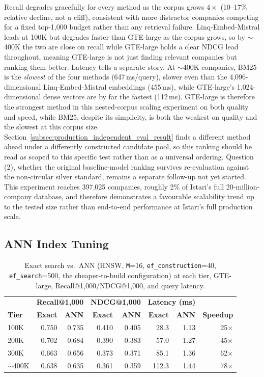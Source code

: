 \documentclass[a4paper,oneside,bibliography=totoc]{scrbook}
\begin{document}
Recall degrades gracefully for every method as the corpus grows $4\times$ (10--17\% relative decline, not a cliff), consistent with more distractor companies competing for a fixed top-1{,}000 budget rather than any retrieval failure. Linq-Embed-Mistral leads at 100K but degrades faster than GTE-large as the corpus grows, so by $\sim$400K the two are close on recall while GTE-large holds a clear NDCG lead throughout, meaning GTE-large is not just finding relevant companies but ranking them better. Latency tells a separate story. At $\sim$400K companies, BM25 is the \emph{slowest} of the four methods (647\,ms/query), slower even than the 4{,}096-dimensional Linq-Embed-Mistral embeddings (455\,ms), while GTE-large's 1{,}024-dimensional dense vectors are by far the fastest (112\,ms). GTE-large is therefore the strongest method in this nested-corpus scaling experiment on both quality and speed, while BM25, despite its simplicity, is both the weakest on quality and the slowest at this corpus size. Section~\ref{subsec:production_independent_eval_result} finds a different method ahead under a differently constructed candidate pool, so this ranking should be read as scoped to this specific test rather than as a universal ordering. Question (2), whether the original baseline-model ranking survives re-evaluation against the non-circular silver standard, remains a separate follow-up not yet started. This experiment reaches 397,025 companies, roughly 2\% of Istari's full 20-million-company database, and therefore demonstrates a favourable scalability trend up to the tested size rather than end-to-end performance at Istari's full production scale.

\subsection{ANN Index Tuning}
\label{subsec:ann_tuning_result}

\begin{table}[ht]
\centering
\caption{Exact search vs.\ ANN (HNSW, \texttt{M}=16, \texttt{ef\_construction}=40, \texttt{ef\_search}=500, the cheaper-to-build configuration) at each tier, GTE-large, Recall@1{,}000/NDCG@1{,}000, and query latency.}
\label{tab:ann_tuning}
\begin{tabular}{lrrrrrrr}
\toprule
& \multicolumn{2}{c}{\textbf{Recall@1{,}000}} & \multicolumn{2}{c}{\textbf{NDCG@1{,}000}} & \multicolumn{2}{c}{\textbf{Latency (ms)}} & \\
\textbf{Tier} & \textbf{Exact} & \textbf{ANN} & \textbf{Exact} & \textbf{ANN} & \textbf{Exact} & \textbf{ANN} & \textbf{Speedup} \\
\midrule
100K & 0.750 & 0.735 & 0.410 & 0.405 & 28.3 & 1.13 & 25$\times$ \\
200K & 0.702 & 0.684 & 0.390 & 0.383 & 57.0 & 1.27 & 45$\times$ \\
300K & 0.663 & 0.656 & 0.373 & 0.371 & 85.1 & 1.36 & 62$\times$ \\
$\sim$400K & 0.638 & 0.635 & 0.361 & 0.359 & 112.3 & 1.44 & 78$\times$ \\
\bottomrule
\end{tabular}
\end{table}
\end{document}
